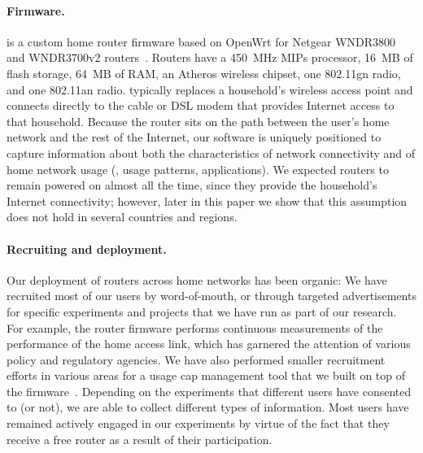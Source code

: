 \paragraph{Firmware.} \name{} is a custom home router firmware based on OpenWrt
for Netgear WNDR3800 and WNDR3700v2 routers~\cite{www-openwrt,www-netgear-3800}.
Routers have a 450~MHz MIPs processor, 16~MB of flash storage, 64~MB of RAM, an
Atheros wireless chipset, one 802.11gn radio, and one 802.11an radio.
\name{} typically replaces a household's wireless access point and connects
directly to the cable or DSL modem that provides Internet access to that
household. Because the router sits on the path between the user's home network
and the rest of the Internet, our software is uniquely positioned to capture
information about both the characteristics of network connectivity and of home
network usage (\eg, usage patterns, applications). We expected routers to remain
powered on almost all the time, since they provide the household's Internet
connectivity; however, later in this paper we show that this assumption does not
hold in several countries and regions.

\paragraph{Recruiting and deployment.} Our deployment of routers across
home networks has been organic: We have recruited most of our users by
word-of-mouth, or through targeted advertisements for specific
experiments and projects that we have run as part of our research.  For
example, the router firmware performs continuous measurements of the
performance of the home access link, which has garnered the attention of
various policy and regulatory agencies.  We have also performed smaller
recruitment efforts in various areas for a usage cap management tool
that we built on top of the firmware~\cite{kim2011communicating}.
Depending on the experiments that different users have consented to (or
not), we are able to collect different types of information.  Most users
have remained actively engaged in our experiments by virtue of the fact
that they receive a free router as a result of their participation.

